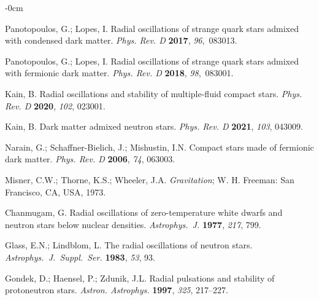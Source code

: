 \documentclass[universe,article,accept,moreauthors,pdftex]{Definitions/mdpi}
\begin{document}
\begin{adjustwidth}{-\extralength}{0cm}
\begin{thebibliography}{999}
Panotopoulos, G.; Lopes, I. 
Radial oscillations of strange quark stars admixed with condensed dark matter. 
\emph{Phys. Rev. D} \textbf{2017}, \emph{96},~083013. 

Panotopoulos, G.; Lopes, I. 
Radial oscillations of strange quark stars admixed with fermionic dark matter. 
\emph{Phys. Rev. D} \textbf{2018}, \emph{98},~083001. 

Kain, B. 
Radial oscillations and stability of multiple-fluid compact stars. 
\emph{Phys. Rev. D}  \textbf{2020}, \emph{102}, 023001.

Kain, B. 
Dark matter admixed neutron stars. 
\emph{Phys. Rev. D}  \textbf{2021}, \emph{103}, 043009.

Narain, G.; Schaffner-Bielich, J.; Mishustin, I.N. 
Compact stars made of fermionic dark matter. 
\emph{Phys. Rev. D} \textbf{2006}, \emph{74}, 063003.

Misner, C.W.; Thorne, K.S.; Wheeler, J.A. 
{\it Gravitation}; 
W. H. Freeman: San Francisco, CA, USA, 1973.%


Chanmugam, G. 
Radial oscillations of zero-temperature white dwarfs and neutron stars below nuclear densities. 
\emph{Astrophys.\ J.} \textbf{1977}, \emph{217}, 799.

Glass, E.N.; Lindblom, L. 
The radial oscillations of neutron stars. 
\emph{Astrophys.\ J.\ Suppl.\ Ser.} \textbf{1983}, \emph{53}, 93.

Gondek, D.; Haensel, P.; Zdunik, J.L. 
Radial pulsations and stability of protoneutron stars. 
\emph{Astron. Astrophys.} \textbf{1997}, \emph{325}, 217--227.


\end{thebibliography}
\end{adjustwidth}
\end{document}
